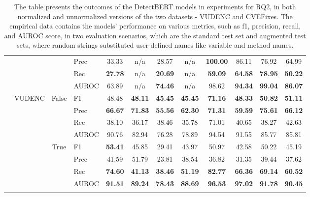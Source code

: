 \documentclass{ieeeaccess}
\begin{document}
\begin{table}[h]
\begin{tabular}{|c|c|c|lcccccccc|}
&&    &\rowcolor{gray!15}   Prec&33.33& n/a & 28.57& n/a & \textbf{100.00}& 86.11& 76.92&64.99\\
  
&&    &Rec&\textbf{27.78}& n/a & \textbf{20.69}& n/a & \textbf{59.09}& \textbf{64.58}& \textbf{78.95}&\textbf{50.22}\\

&&    &\rowcolor{gray!15}    AUROC &63.89& n/a & \textbf{74.46}& n/a & 98.62& \textbf{94.34}& \textbf{99.04}&\textbf{86.07}\\ 
\cline{2-12}

&\multirow{8}{*}{VUDENC}
&\multirow{4}{*}{False}

&     F1 &48.48& \textbf{48.11}& \textbf{45.45}& \textbf{45.45}& \textbf{71.16}& \textbf{48.33}& \textbf{50.82}&\textbf{51.11}\\
 
&&    &\rowcolor{gray!15}   Prec&\textbf{66.67}& \textbf{71.83}& \textbf{55.56}& \textbf{62.30}& \textbf{71.31}& \textbf{59.59}& \textbf{75.61}&\textbf{66.12}\\  

&&    &Rec&38.10& 36.17& 38.46& 35.78& 71.01& 40.65& 38.27&42.63\\

&&    &\rowcolor{gray!15}    AUROC &90.76& 82.94& 76.28& 78.89& 94.54& 91.55& 85.77&85.81\\
\cline{3-12}

&&\multirow{4}{*}{True}
&    F1 &\textbf{53.41}& 45.85& 29.41& 43.97& 50.97& 42.58& 50.22&45.19\\
  
&&    &\rowcolor{gray!15}   Prec&41.59& 51.79& 23.81& 38.54& 36.82& 31.35& 39.44&37.62\\
  
&&    &Rec&\textbf{74.60}& \textbf{41.13}& \textbf{38.46}& \textbf{51.19}& \textbf{82.77}& \textbf{66.36}& \textbf{69.14}&\textbf{60.52}\\

&&    &\rowcolor{gray!15}    AUROC&\textbf{91.51}& \textbf{89.24}& \textbf{78.43}& \textbf{88.69}& \textbf{96.53}& \textbf{97.02}& \textbf{91.78}&\textbf{90.45}\\
\Xhline{2\arrayrulewidth}

\bottomrule
\end{tabular}
\label{table:RQ2_result}
\caption{The table presents the outcomes of the DetectBERT models in experiments for RQ2, in both normalized and unnormalized versions of the two datasets - VUDENC and CVEFixes. The empirical  data contains the models' performance on various metrics, such as f1, precision, recall, and AUROC score, in two evaluation scenarios, which are the standard test set and augmented test sets, where random strings substituted user-defined names like variable and method names. }
\end{table}
\end{document}
